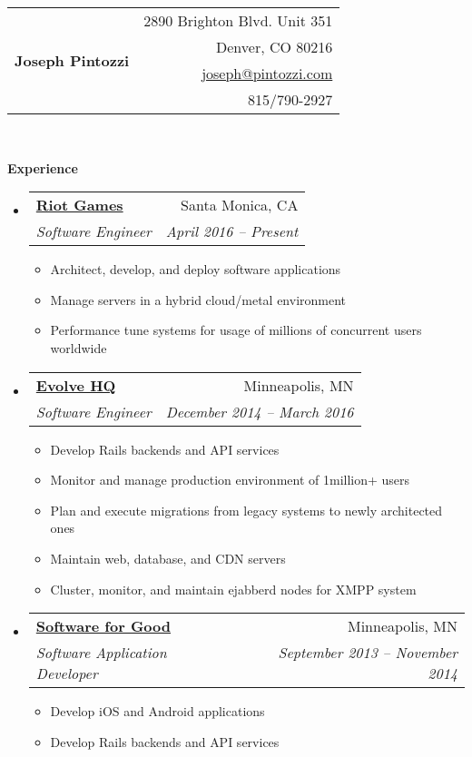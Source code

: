 \documentclass[letterpaper,12pt]{article}
\makeatletter
\newcommand{\resitem}[1]{\item #1 \vspace{-2pt}}
\newcommand{\resheading}[1]{{\large \colorbox{mygrey}{\begin{minipage}{\textwidth}{\textbf{#1 \vphantom{p\^{E}}}}\end{minipage}}}}
\newcommand{\ressubheading}[4]{
      \begin{tabular*}{6.5in}{l@{\extracolsep{\fill}}r}
        \textbf{#1} & #2 \\
        \textit{#3} & \textit{#4} \\
      \end{tabular*}\vspace{-6pt}}
\makeatother
\begin{document}
\newcommand{\mywebheader}{
  \begin{tabular*}{7in}{l@{\extracolsep{\fill}}r}
    \multirow{4}{*}{\huge \bf Joseph Pintozzi} & {2890 Brighton Blvd. Unit 351}\\
                            & {Denver, CO 80216}\\
                            & \href{mailto:joseph@pintozzi.com}{joseph@pintozzi.com}\\
                            & {815/790-2927}
  \end{tabular*}
\\
\vspace{0.1in}
}

\mywebheader

\resheading{Experience}
  \begin{itemize}
    \item
      \ressubheading{\href{http://riotgames.com}{Riot Games}}{Santa Monica, CA}{Software Engineer}{April 2016 -- Present}
        { \footnotesize
        \begin{itemize}
            \resitem{Architect, develop, and deploy software applications}
            \resitem{Manage servers in a hybrid cloud/metal environment}
            \resitem{Performance tune systems for usage of millions of concurrent users worldwide}
        \end{itemize}
         }
       \item
         \ressubheading{\href{http://evolvehq.com/}{Evolve HQ}}{Minneapolis, MN}{Software Engineer}{December 2014 -- March 2016}
        { \footnotesize
        \begin{itemize}
            \resitem{Develop Rails backends and API services}
            \resitem{Monitor and manage production environment of 1million+ users}
            \resitem{Plan and execute migrations from legacy systems to newly architected ones}
            \resitem{Maintain web, database, and CDN servers}
            \resitem{Cluster, monitor, and maintain ejabberd nodes for XMPP system}
        \end{itemize}
         }
       \item
         \ressubheading{\href{http://softwareforgood.com/}{Software for Good}}{Minneapolis, MN}{Software Application Developer}{September 2013 -- November 2014}
        { \footnotesize
        \begin{itemize}
            \resitem{Develop iOS and Android applications}
            \resitem{Develop Rails backends and API services}

\end{itemize}}
\end{itemize}
\end{document}
